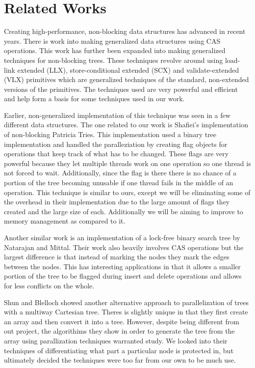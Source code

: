 \documentclass[conference]{IEEEtran}
\begin{document}
\section{Related Works}
Creating high-performance, non-blocking data structures has advanced in recent years. There is work into making generalized data structures using CAS operations. \cite{Brown2013} This work has further been expanded into making generalized techniques for non-blocking trees. \cite{Brown2014} These techniques revolve around using load-link extended (LLX), store-conditional extended (SCX) and validate-extended (VLX) primitives which are generalized techniques of the standard, non-extended versions of the primitives. \cite{Brown2013, Brown2014} The techniques used are very powerful and efficient and help form a basis for some techniques used in our work. 
\par
Earlier, non-generalized implementation of this technique was seen in a few different data structures. The one related to our work is Shafiei's implementation of non-blocking Patricia Tries. \cite{Shafiei2013} This implementation used a binary tree implementation and handled the paralleziation by creating flag objects for operations that keep track of what has to be changed. These flags are very powerful because they let multiple threads work on one operation so one thread is not forced to wait.  Additionally, since the flag is there there is no chance of a portion of the tree becoming unusable if one thread fails in the middle of an operation. \cite{Shafiei2013, Howley2012} This technique is similar to ours, except we will be eliminating some of the overhead in their implementation due to the large amount of flags they created and the large size of each. Additionally we will be aiming to improve to memory management as compared to it. 
\par
Another similar work is an implementation of a lock-free binary search tree by Natarajan and Mittal. Their work also heavily involves CAS operations but the largest difference is that instead of marking the nodes they mark the edges between the nodes.\cite{Natarajan2014} This has interesting applications in that it allows a smaller portion of the tree to be flagged during insert and delete operations and allows for less conflicts on the whole.
\par
Shun and Blelloch showed another alternative approach to parallelization of trees with a multiway Cartesian tree. Theres is slightly unique in that they first create an array and then convert it into a tree. However, despite being different from out project, the algorithims they show in order to generate the tree from the array using parallization techniques warranted study. We looked into their techniques of differentiating what part a particular node is protected in, but ultimately decided the techniques were too far from our own to be much use. \cite{Shun2014}
\end{document}
